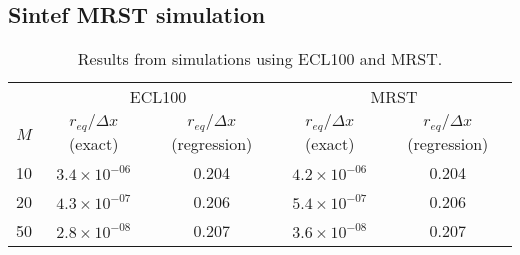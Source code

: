 \subsection{Sintef MRST simulation} %
\label{sub:sintef_mrst_simulation}


\begin{table}[htbp]
\centering
    \caption{Results from simulations using ECL100 and MRST.}
    \begin{tabular}{c|cc|cc}
        \toprule
            & \multicolumn{2}{c|}{ECL100} & \multicolumn{2}{c}{MRST} \\
        $M$ &  $r_{eq}/\Delta x$ (exact) & $r_{eq}/\Delta x$ (regression) & $r_{eq}/\Delta x$ (exact) & $r_{eq}/\Delta x$ (regression) \\
        \midrule
        10  & $3.4\times 10^{-06}$       & 0.204                          &  $4.2\times 10^{-06}$     & 0.204 \\
        20  & $4.3\times 10^{-07}$       & 0.206                          &  $5.4\times 10^{-07}$     & 0.206 \\
        50  & $2.8\times 10^{-08}$       & 0.207                          &  $3.6\times 10^{-08}$     & 0.207 \\
        \bottomrule
    \end{tabular}
    \label{tbl:simulation-results}
\end{table}


